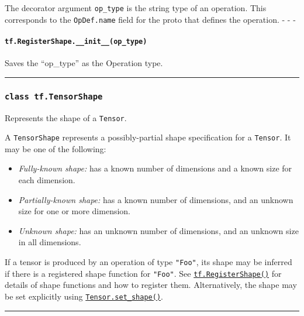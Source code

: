 The decorator argument \lstinline{op_type} is the string type of an
operation. This corresponds to the \lstinline{OpDef.name} field for the
proto that defines the operation. - - -

\paragraph{\texorpdfstring{\lstinline{tf.RegisterShape.__init__(op_type)}
}{tf.RegisterShape.__init__(op_type) }}\label{tf.registershape.ux5fux5finitux5fux5fopux5ftype}

Saves the ``op_type'' as the Operation type.

\begin{center}\rule{0.5\linewidth}{\linethickness}\end{center}

\subsubsection{\texorpdfstring{\lstinline{class tf.TensorShape}
}{class tf.TensorShape }}\label{class-tf.tensorshape}

Represents the shape of a \lstinline{Tensor}.

A \lstinline{TensorShape} represents a possibly-partial shape specification
for a \lstinline{Tensor}. It may be one of the following:

\begin{itemize}
\tightlist
\item
  \emph{Fully-known shape:} has a known number of dimensions and a known
  size for each dimension.
\item
  \emph{Partially-known shape:} has a known number of dimensions, and an
  unknown size for one or more dimension.
\item
  \emph{Unknown shape:} has an unknown number of dimensions, and an
  unknown size in all dimensions.
\end{itemize}

If a tensor is produced by an operation of type \lstinline{"Foo"}, its
shape may be inferred if there is a registered shape function for
\lstinline{"Foo"}. See
\href{../../api_docs/python/framework.md\#RegisterShape}{\lstinline{tf.RegisterShape()}}
for details of shape functions and how to register them. Alternatively,
the shape may be set explicitly using
\href{../../api_docs/python/framework.md\#Tensor.set_shape}{\lstinline{Tensor.set_shape()}}.

\begin{center}\rule{0.5\linewidth}{\linethickness}\end{center}


